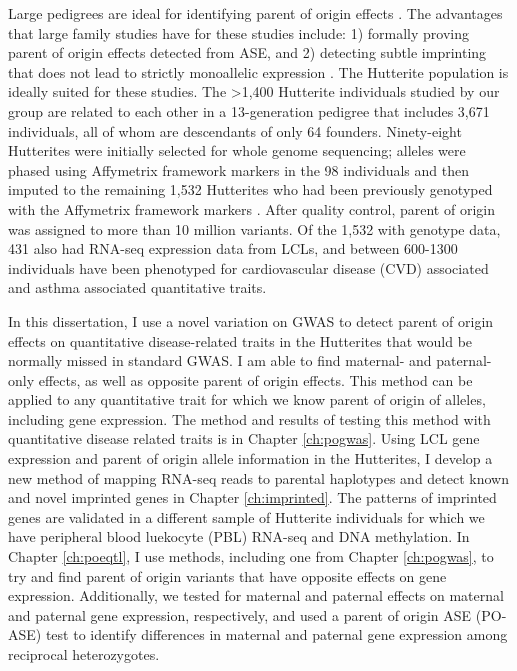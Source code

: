 Large pedigrees are ideal for identifying parent of origin effects \cite{Baran:2015cx}. The advantages that large family studies have for these studies include: 1) formally proving parent of origin effects detected from ASE, and 2) detecting subtle imprinting that does not lead to strictly monoallelic expression \cite{Baran:2015cx}. The Hutterite population is ideally suited for these studies. The \textgreater 1,400 Hutterite individuals studied by our group are related to each other in a 13-generation pedigree that includes 3,671 individuals, all of whom are descendants of only 64 founders. Ninety-eight Hutterites were initially selected for whole genome sequencing; alleles were phased using Affymetrix framework markers in the 98 individuals and then imputed to the remaining 1,532 Hutterites who had been previously genotyped with the Affymetrix framework markers \cite{Livne2015}. After quality control, parent of origin was assigned to more than 10 million variants. Of the 1,532 with genotype data, 431 also had RNA-seq expression data from LCLs, and between 600-1300 individuals have been phenotyped for cardiovascular disease (CVD) associated  and asthma associated quantitative traits.


In this dissertation, I use a novel variation on GWAS to detect parent of origin effects on quantitative disease-related traits in the Hutterites that would be normally missed in standard GWAS. I am able to find maternal- and paternal-only effects, as well as opposite parent of origin effects. This method can be applied to any quantitative trait for which we know parent of origin of alleles, including gene expression. The method and results of testing this method with quantitative disease related traits is in Chapter \ref{ch:pogwas}. Using LCL gene expression and parent of origin allele information in the Hutterites, I develop a new method of mapping RNA-seq reads to parental haplotypes and detect known and novel imprinted genes in Chapter \ref{ch:imprinted}. The patterns of imprinted genes are validated in a different sample of Hutterite individuals for which we have peripheral blood luekocyte (PBL) RNA-seq and DNA methylation. In Chapter \ref{ch:poeqtl}, I use methods, including one from Chapter \ref{ch:pogwas}, to try and find parent of origin variants that have opposite effects on gene expression. Additionally, we tested for maternal and paternal effects on maternal and paternal gene expression, respectively, and used a parent of origin ASE (PO-ASE) test to identify differences in maternal and paternal gene expression among reciprocal heterozygotes. 


